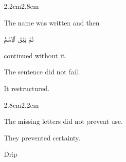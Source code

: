 \begin{adjustwidth}{2.2cm}{2.8cm}

The name was written and then
\begin{AR}
لَمْ يَبْقَ ٱلِاسْمُ
\end{AR}
continued without it.

\vspace{2em}

The sentence did not fail.

\medskip

It restructured.

\vspace{3em}

\end{adjustwidth}

\begin{center}
\end{center}

\vspace{3em}

\begin{adjustwidth}{2.8cm}{2.2cm}

The missing letters did not prevent use.

\medskip

They prevented certainty.

\vspace{3em}

\end{adjustwidth}

\begin{center}
\end{center}

\vspace{3em}

\begin{center}

\smallskip


\smallskip

\end{center}

\vspace{3em}

\begin{center}

\medskip

\end{center}

\vspace{3em}

\begin{center}
Drip
\end{center}

\vspace{2em}

\begin{center}
\end{center}
